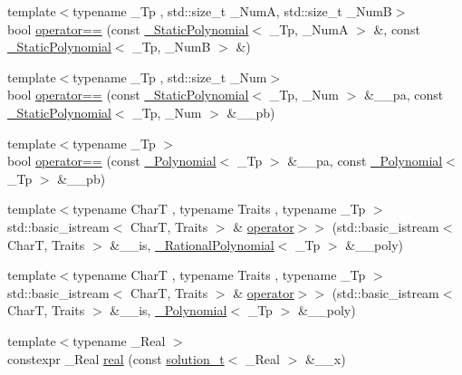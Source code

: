 \begin{DoxyCompactItemize}
\item 
{\footnotesize template$<$typename \+\_\+\+Tp , std\+::size\+\_\+t \+\_\+\+NumA, std\+::size\+\_\+t \+\_\+\+NumB$>$ }\\bool \hyperlink{namespace____gnu__cxx_a85c9740061a6497bb695d2ee147f52b8}{operator==} (const \hyperlink{class____gnu__cxx_1_1__StaticPolynomial}{\+\_\+\+Static\+Polynomial}$<$ \+\_\+\+Tp, \+\_\+\+NumA $>$ \&, const \hyperlink{class____gnu__cxx_1_1__StaticPolynomial}{\+\_\+\+Static\+Polynomial}$<$ \+\_\+\+Tp, \+\_\+\+NumB $>$ \&)
\item 
{\footnotesize template$<$typename \+\_\+\+Tp , std\+::size\+\_\+t \+\_\+\+Num$>$ }\\bool \hyperlink{namespace____gnu__cxx_a2d1430ebbbaf156a6c80a8e8107960e1}{operator==} (const \hyperlink{class____gnu__cxx_1_1__StaticPolynomial}{\+\_\+\+Static\+Polynomial}$<$ \+\_\+\+Tp, \+\_\+\+Num $>$ \&\+\_\+\+\_\+pa, const \hyperlink{class____gnu__cxx_1_1__StaticPolynomial}{\+\_\+\+Static\+Polynomial}$<$ \+\_\+\+Tp, \+\_\+\+Num $>$ \&\+\_\+\+\_\+pb)
\item 
{\footnotesize template$<$typename \+\_\+\+Tp $>$ }\\bool \hyperlink{namespace____gnu__cxx_a7427db234bb8c8aab722a3196e898215}{operator==} (const \hyperlink{class____gnu__cxx_1_1__Polynomial}{\+\_\+\+Polynomial}$<$ \+\_\+\+Tp $>$ \&\+\_\+\+\_\+pa, const \hyperlink{class____gnu__cxx_1_1__Polynomial}{\+\_\+\+Polynomial}$<$ \+\_\+\+Tp $>$ \&\+\_\+\+\_\+pb)
\item 
{\footnotesize template$<$typename CharT , typename Traits , typename \+\_\+\+Tp $>$ }\\std\+::basic\+\_\+istream$<$ CharT, Traits $>$ \& \hyperlink{namespace____gnu__cxx_a71511bc907f332ce9bb925c953f11714}{operator$>$$>$} (std\+::basic\+\_\+istream$<$ CharT, Traits $>$ \&\+\_\+\+\_\+is, \hyperlink{class____gnu__cxx_1_1__RationalPolynomial}{\+\_\+\+Rational\+Polynomial}$<$ \+\_\+\+Tp $>$ \&\+\_\+\+\_\+poly)
\item 
{\footnotesize template$<$typename CharT , typename Traits , typename \+\_\+\+Tp $>$ }\\std\+::basic\+\_\+istream$<$ CharT, Traits $>$ \& \hyperlink{namespace____gnu__cxx_acf7d03318756578d08f672212cd91234}{operator$>$$>$} (std\+::basic\+\_\+istream$<$ CharT, Traits $>$ \&\+\_\+\+\_\+is, \hyperlink{class____gnu__cxx_1_1__Polynomial}{\+\_\+\+Polynomial}$<$ \+\_\+\+Tp $>$ \&\+\_\+\+\_\+poly)
\item 
{\footnotesize template$<$typename \+\_\+\+Real $>$ }\\constexpr \+\_\+\+Real \hyperlink{namespace____gnu__cxx_a2743043701f8e4c87d3f0f06ddb11348}{real} (const \hyperlink{namespace____gnu__cxx_ae20ea642de50eb361074c62676b0159c}{solution\+\_\+t}$<$ \+\_\+\+Real $>$ \&\+\_\+\+\_\+x)

\end{DoxyCompactItemize}
